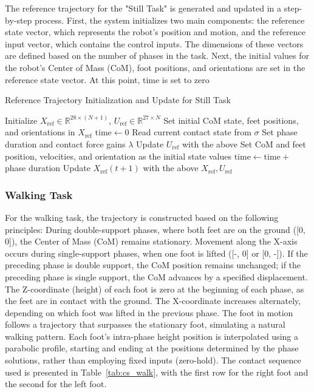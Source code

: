 \documentclass[main.tex]{subfiles}
\begin{document}
The reference trajectory for the "Still Task" is generated and updated in a step-by-step process. First, the system initializes two main components: the reference state vector, which represents the robot's position and motion, and the reference input vector, which contains the control inputs. The dimensions of these vectors are defined based on the number of phases in the task.
Next, the initial values for the robot's Center of Mass (CoM), foot positions, and orientations are set in the reference state vector. At this point, time is set to zero
\begin{algorithm}[H]
\caption{Reference Trajectory Initialization and Update for Still Task}
\begin{algorithmic}[1]
\State Initialize $X_{\text{ref}} \in \mathbb{R}^{28 \times (N+1)}$, $U_{\text{ref}} \in \mathbb{R}^{27 \times N}$
\State Set initial CoM state, feet positions, and orientations in $X_{\text{ref}}$
\State $\text{time} \gets 0$
    \State Read current contact state from $\sigma$
    \State Set phase duration and contact force gains $\lambda$
    \State Update $U_{\text{ref}}$ with the above
    \State Set CoM and feet position, velocities, and orientation as the initial state values
    \State $\text{time} \gets \text{time} +$ phase duration
    \State Update $X_{\text{ref}}(t+1)$ with the above
\EndFor
\State \Return $X_{\text{ref}}, U_{\text{ref}}$
\end{algorithmic}
\end{algorithm}

\subsubsection*{Walking Task}

For the walking task, the trajectory is constructed based on the following principles:
During double-support phases, where both feet are on the ground ([0, 0]), the Center of Mass (CoM) remains stationary. Movement along the X-axis occurs during single-support phases, when one foot is lifted ([-, 0] or [0, -]). If the preceding phase is double support, the CoM position remains unchanged; if the preceding phase is single support, the CoM advances by a specified displacement.
The Z-coordinate (height) of each foot is zero at the beginning of each phase, as the feet are in contact with the ground. The X-coordinate increases alternately, depending on which foot was lifted in the previous phase. The foot in motion follows a trajectory that surpasses the stationary foot, simulating a natural walking pattern.
Each foot's intra-phase height position is interpolated using a parabolic profile, starting and ending at the positions determined by the phase solutions, rather than employing fixed inputs (zero-hold).
The contact sequence used is presented in Table~\ref{tab:cs_walk}, with the first row for the right foot and the second for the left foot.
\end{document}
